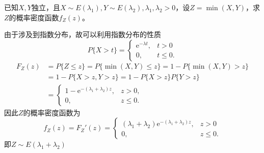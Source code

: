 \begin{example}
    已知$X,Y$独立，且$X\sim E(\lambda_1), Y\sim E(\lambda_2), \lambda_1,\lambda_2>0$，设$Z=\min(X,Y)$，求$Z$的概率密度函数$f_Z(z)$。
\end{example}
\begin{solution}
    由于涉及到指数分布，故可以利用指数分布的性质
    \[
        P\{X>t\} =
        \begin{cases}
            \mathrm{e}^{-\lambda t}, & t>0      \\
            0,                       & t\leq 0.
        \end{cases}
    \]
    \begin{align*}
        F_Z(z) & = P\{Z\leq z\} = P\{ \min(X,Y)\leq z \} = 1 - P\{\min(X,Y) > z\} \\
               & =1 - P\{X>z, Y>z\} = 1-P\{X>z\}P\{Y>z\}                          \\
               & =
        \begin{cases}
            1-\mathrm{e}^{-(\lambda_1+\lambda_2)z} , & z>0,     \\
            0,                                       & z\leq 0.
        \end{cases}
    \end{align*}
    因此$Z$的概率密度函数为
    \[
        f_Z(z) = F_Z'(z) =
        \begin{cases}
            (\lambda_1+\lambda_2)\mathrm{e}^{-(\lambda_1+\lambda_2)z}, & z>0      \\
            0,                                                         & z\leq 0.
        \end{cases}
    \]
    即$Z\sim E(\lambda_1+\lambda_2)$
\end{solution}

